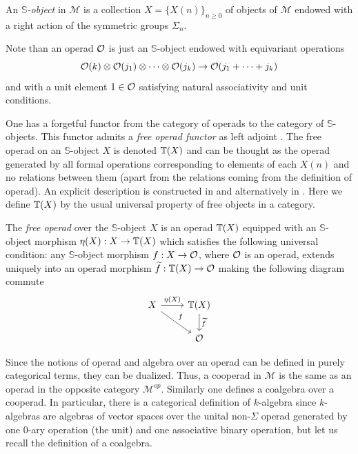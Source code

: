 \documentclass[TFM.tex]{subfiles}
\begin{document}
\begin{defi}
 An \emph{$\mathbb{S}$-object} in $\mathscr{M}$ is a collection $X=\{X(n)\}_{n\geq 0}$ of objects of $\mathscr{M}$ endowed with a right action of the symmetric groups $\Sigma_n$.
\end{defi}

Note than an operad ${\mathcal O}$ is just an $\mathbb{S}$-object endowed with
equivariant operations
\[{\mathcal O}(k)\otimes{\mathcal O}(j_1)\otimes\cdots\otimes{\mathcal O}(j_k)\to {\mathcal O}(j_1+\cdots+j_k)\]
and with a unit element $1 \in{\mathcal O}$ satisfying natural associativity and unit conditions.




One has a forgetful functor from the category of operads to the category of $\mathbb{S}$-objects. This functor admits a \emph{free operad functor} as left adjoint \cite{GJHinich}. The free operad on an $\mathbb{S}$-object $X$ is denoted $\mathbb{T}(X)$ and can be thought as the operad generated by all formal operations corresponding to elements of each $X(n)$ and no relations between them (apart from the relations coming from the definition of operad). An explicit description is constructed in \cite{GJHinich} and alternatively in \cite{AlgebraicOperads}. Here we define $\mathbb{T}(X)$ by the usual universal property of free objects in a category. 

\begin{defi}
The \emph{free operad} over the $\mathbb{S}$-object $X$ is an operad $\mathbb{T}(X)$ equipped with an $\mathbb{S}$-object morphism $\eta(X):X\to\mathbb{T}(X)$ which satisfies the following universal condition: any $\mathbb{S}$-object morphism $f:X\to {\mathcal O}$, where ${\mathcal O}$ is an operad, extends uniquely into an operad morphism $\widetilde{f}:\mathbb{T}(X)\to{\mathcal O}$ making the following diagram commute
\[
\begin{tikzcd}
X\arrow[r, "\eta(X)"]\arrow[dr,"f"] & \T(X)\arrow[d, "\widetilde{f}"]\\
& \OO
\end{tikzcd}
\] 
\end{defi}

Since the notions of operad and algebra over an operad can be defined in purely categorical terms, they can be dualized. Thus, a cooperad in $\mathscr{M}$ is the same as an operad in the opposite category $\mathscr{M}^{op}$. Similarly one defines a coalgebra over a cooperad. In particular, there is a categorical definition of $k$-algebra since $k$-algebras are algebras of vector spaces over the unital non-$\Sigma$ operad generated by one 0-ary operation (the unit) and one associative binary operation, but let us recall the definition of a coalgebra.
\end{document}

